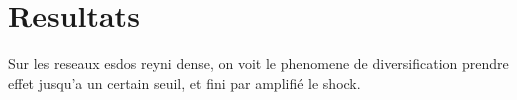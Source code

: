 \section{Resultats}
Sur les reseaux esdos reyni dense, on voit le phenomene de diversification prendre effet jusqu'a un certain seuil, et fini par amplifié le shock.